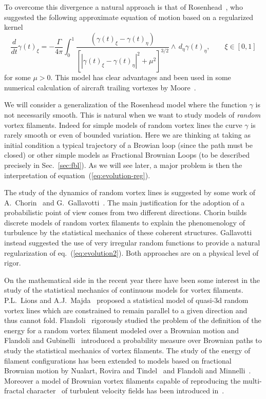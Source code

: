 \documentclass[a4paper,12pt,reqno]{amsart}
\begin{document}
To overcome this divergence a natural approach is that of
Rosenhead~\cite{Rosenhead}, who suggested the following approximate equation of
motion based on a regularized kernel
\begin{equation}
  \label{eq:evolution-reg}
 \frac{d}{dt} \gamma(t)_\xi 
= -\frac{\Gamma}{4\pi}
\int_0^1\frac{(\gamma(t)_\xi-\gamma(t)_\eta)}{[|\gamma(t)_\xi-\gamma(t)_\eta|^2
  + \mu^2]^{3/2}}\wedge \, d_\eta \gamma(t)_\eta
, \qquad \xi
 \in [0,1]  
\end{equation}
for some $\mu>0.$
This model has clear advantages and been used in some  numerical
calculation of  aircraft trailing vortexes by Moore~\cite{Moore}.

We will consider a generalization of the Rosenhead model 
where the function $\gamma$ is not necessarily smooth. This
is natural when we want to study models of
\emph{random} vortex filaments. Indeed for simple models of random
vortex lines the curve $\gamma$ is rarely smooth or even of bounded
variation. Here we are thinking at taking as initial condition a
typical trajectory of a Browian loop (since the path must be closed)
or other simple models as Fractional Brownian Loops (to be described
precisely in Sec.~\ref{sec:fbl}). 
As we will see later, a major  problem is then the interpretation of 
equation~(\ref{eq:evolution-reg}).
 


The study of the dynamics of random vortex lines is suggested by some
work of A.~Chorin~\cite{Chorin} and G.~Gallavotti~\cite{Gallavotti}.
The main justification for the adoption of a probabilistic point of
view comes from two different directions. Chorin builds discrete models of
random vortex filaments to explain the phenomenology of turbulence by
the statistical mechanics of these coherent structures. Gallavotti
instead suggested the use of very irregular random functions to
provide a natural regularization of eq.~(\ref{eq:evolution2}). Both
approaches are on a physical level of rigor. 

On the mathematical side in the recent year there have been some
interest in the study of the statistical mechanics of continuous
models for vortex filaments. 
P.L.~Lions and A.J.~Majda~\cite{LionsMajda} proposed a
statistical model of quasi-3d random vortex lines which are constrained
to remain parallel to a given direction and thus cannot fold.
Flandoli~\cite{Flandoli} rigorously studied the problem of the
definition of the energy for a random vortex filament modeled over a
Brownian motion and Flandoli and Gubinelli~\cite{FlaGub} introduced a
probability measure over Brownian paths to study the statistical
mechanics of vortex filaments. The study of the energy of filament
configurations has been extended to models based on fractional
Brownian motion by Nualart, Rovira and Tindel~\cite{NRT} and Flandoli
and Minnelli~\cite{FlaMin}.
Moreover a model of Brownian vortex
filaments capable of reproducing the multi-fractal character~\cite{Frisch} of
turbulent velocity fields has been introduced in~\cite{FlaGub2}.
\end{document}
